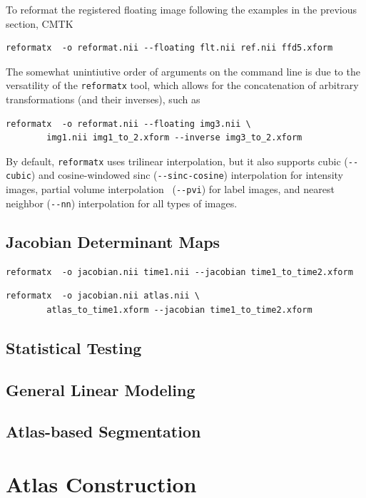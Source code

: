 \documentclass{InsightArticle}
\begin{document}
To reformat the registered floating image following the examples in
the previous section, CMTK
\begin{verbatim}
reformatx  -o reformat.nii --floating flt.nii ref.nii ffd5.xform
\end{verbatim}
The somewhat unintiutive order of arguments on the command line is due to the
versatility of the \verb|reformatx| tool, which allows for the concatenation
of arbitrary transformations (and their inverses), such as
\begin{verbatim}
reformatx  -o reformat.nii --floating img3.nii \
        img1.nii img1_to_2.xform --inverse img3_to_2.xform
\end{verbatim} 
By default, \verb|reformatx| uses trilinear interpolation, but it also
supports cubic (\verb|--cubic|) and cosine-windowed sinc
(\verb|--sinc-cosine|) interpolation for intensity images, partial volume
interpolation~\cite{MaesCollVand:1997} (\verb|--pvi|) for label images, and
nearest neighbor (\verb|--nn|) interpolation for all types of images.

\subsection{Jacobian Determinant Maps}

\begin{verbatim}
reformatx  -o jacobian.nii time1.nii --jacobian time1_to_time2.xform
\end{verbatim}

\begin{verbatim}
reformatx  -o jacobian.nii atlas.nii \
        atlas_to_time1.xform --jacobian time1_to_time2.xform
\end{verbatim}

\subsection{Statistical Testing}

\subsection{General Linear Modeling}

\subsection{Atlas-based Segmentation}

\section{Atlas Construction}
\end{document}
